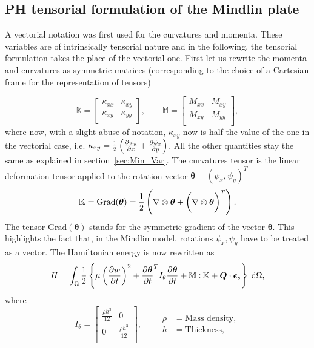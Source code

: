 \documentclass[preprint,12pt]{elsarticle}
\newcommand{\tens}[1]{%
	\mathbin{\mathop{\otimes}\displaylimits_{#1}}%
}
\def\onedot{$\mathsurround0pt\ldotp$}
\def\cddot{%
	\mathbin{\vcenter{\baselineskip.67ex
			\hbox{\onedot}\hbox{\onedot}}%
}}
\begin{document}
\subsection{PH tensorial formulation of the Mindlin plate}
\label{sec:PH_ten_Min}

A vectorial notation was first used for the curvatures and momenta. These variables are of intrinsically tensorial nature and in the following, the tensorial formulation takes the place of the vectorial one. First let us rewrite the momenta and curvatures as symmetric matrices (corresponding to the choice of a Cartesian frame for the representation of tensors)

\begin{equation}
\mathbb{K} = 
\begin{bmatrix}
\kappa_{xx} &  \kappa_{xy}\\
\kappa_{xy} & \kappa_{yy} \\
\end{bmatrix}, \qquad
\mathbb{M}=
\begin{bmatrix}
M_{xx} & M_{xy} \\
M_{xy} & M_{yy} \\
\end{bmatrix},
\end{equation}
where now, with a slight abuse of notation,  $\kappa_{xy}$ now is half the value of the one in the vectorial case, i.e. $\kappa_{xy} =\frac{1}{2}\left(\diffp{\psi_y}{x} + \diffp{\psi_x}{y} \right)$. All the other quantities stay the same as explained in section~\ref{sec:Min_Var}. The curvatures tensor is the linear deformation tensor applied to the rotation vector $\bm{\theta} = (\psi_x, \psi_y)^T$
\begin{equation}
\mathbb{K} = \mathrm{Grad}(\bm{\theta}) =  \frac{1}{2} \left(\nabla \tens{} \bm{\theta} + \left(\nabla \tens{} \bm{\theta}\right)^T \right).
\end{equation}
The tensor $\mathrm{Grad}(\bm{\theta})$ stands for the symmetric gradient of the vector $\bm{\theta}$.
This highlights the fact that, in the Mindlin model, rotations $\psi_x, \psi_y$ have to be treated as a vector. The Hamiltonian energy is now rewritten as
\begin{equation}
H = \int_{\Omega} \frac{1}{2} \left\{ \mu \left(\diffp{w}{t} \right)^2 +  \diffp{\bm{\theta}}{t}^T I_{\theta}  \diffp{\bm{\theta}}{t} +   \mathbb{M} \cddot \mathbb{K} + \bm{Q} \cdot \bm{\epsilon}_s  \right\}  \d\Omega, 
\end{equation}
where 
\begin{equation*}
I_{\theta} = 
\begin{bmatrix}
\frac{\rho h^3}{12} & 0 \\
0 & \frac{\rho h^3}{12} \\
\end{bmatrix}, \qquad
\begin{aligned}
\rho &= \text{Mass density}, \\
h &= \text{Thickness},
\end{aligned} 
\end{equation*}
\end{document}

